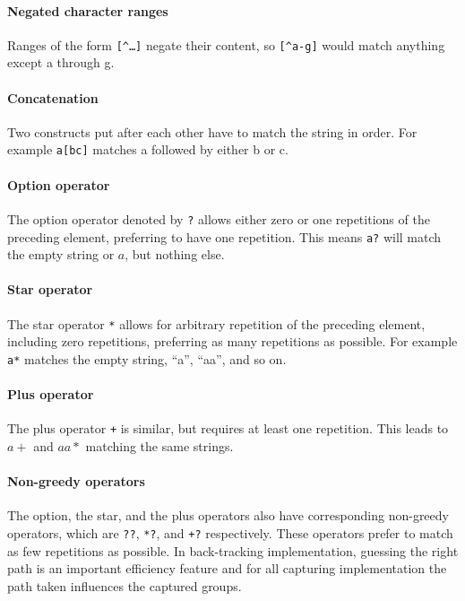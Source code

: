 \documentclass[11pt]{Thesis}
\theoremstyle{definition}
\begin{document}
\paragraph{Negated character ranges} Ranges of the form \texttt{[\string^\dots]} 
negate their content, so \texttt{[\string^a-g]} would match anything except a through g.

\paragraph{Concatenation} Two constructs put after each other have to match 
the string in order. For example \texttt{a[bc]} matches a followed by either 
b or c.

\paragraph{Option operator} The option operator denoted by \texttt{?} allows 
either zero or one repetitions of the preceding element, preferring to have 
one repetition. This means \texttt{a?} will match the empty string or $a$, but nothing else.

\paragraph{Star operator} The star operator \texttt{*} allows for arbitrary 
repetition of the preceding element, including zero repetitions, preferring as 
many repetitions as possible. For example \texttt{a*} matches the empty string,
``a'', ``aa'', and so on.

\paragraph{Plus operator} The plus operator \texttt{+} is similar, but 
requires at least one repetition. This leads to $a+$ and $aa*$ matching the
same strings.

\paragraph{Non-greedy operators} The option, the star, and the plus operators 
also have corresponding non-greedy operators, which are \texttt{??}, 
\texttt{*?}, and \texttt{+?} respectively. These operators prefer to match as 
few repetitions as possible. In back-tracking implementation, guessing the 
right path is an important efficiency feature and for all capturing 
implementation the path taken influences the captured groups.
\end{document}
